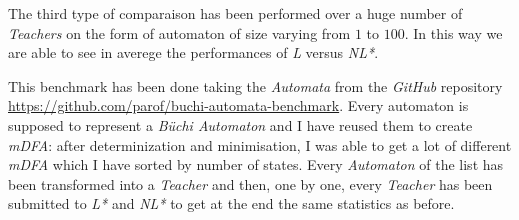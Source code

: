 The third type of comparaison has been performed over a huge number of \textit{Teachers} on the form of automaton of size varying from $1$ to $100$. In this way we are able to see in averege the performances of \textit{L} versus \textit{NL*}.

This benchmark has been done taking the \textit{Automata} from the \textit{GitHub} repository \url{https://github.com/parof/buchi-automata-benchmark}. Every automaton is supposed to represent a \textit{Büchi Automaton} and I have reused them to create \textit{mDFA}: after determinization and minimisation, I was able to get a lot of different \textit{mDFA} which I have sorted by number of states. Every \textit{Automaton} of the list has been transformed into a \textit{Teacher} and then, one by one, every \textit{Teacher} has been submitted to \textit{L*} and \textit{NL*} to get at the end the same statistics as before.


